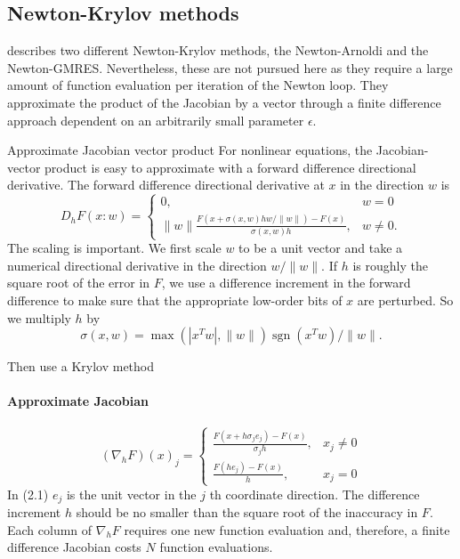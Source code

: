 
\subsection{Newton-Krylov methods}

\cite{sidi_vector_2017} describes two different Newton-Krylov methods, the Newton-Arnoldi and the Newton-GMRES.
Nevertheless, these are not pursued here as they require a large amount of function evaluation per iteration of the Newton loop. They approximate the product of the Jacobian by a vector through a finite difference approach dependent on an arbitrarily small parameter \(\epsilon\).

Approximate Jacobian vector product
For nonlinear equations, the Jacobian-vector product is easy to approximate with a forward difference directional derivative. The forward difference directional derivative at \(x\) in the direction \(w\) is
\[
D_{h} F(x: w)=\left\{\begin{array}{ll}
0, & w=0 \\
\|w\| \frac{F(x+\sigma(x, w) h w /\|w\|)-F(x)}{\sigma(x, w) h}, & w \neq 0 .
\end{array}\right.
\]
The scaling is important. We first scale \(w\) to be a unit vector and take a numerical directional derivative in the direction \(w /\|w\|\). If \(h\) is roughly the square root of the error in \(F\), we use a difference increment in the forward difference to make sure that the appropriate low-order bits of \(x\) are perturbed. So we multiply \(h\) by
\[
\sigma(x, w)=\max \left(\left|x^{T} w\right|,\|w\|\right) \operatorname{sgn}\left(x^{T} w\right) /\|w\| .
\]

Then use a Krylov method

\paragraph{Approximate Jacobian}

\[
\left(\nabla_{h} F\right)(x)_{j}=\left\{\begin{array}{ll}
\frac{F\left(x+h \sigma_{j} e_{j}\right)-F(x)}{\sigma_{j} h}, & x_{j} \neq 0 \\
\frac{F\left(h e_{j}\right)-F(x)}{h}, & x_{j}=0
\end{array}\right.
\]
In (2.1) \(e_{j}\) is the unit vector in the \(j\) th coordinate direction. The difference increment \(h\) should be no smaller than the square root of the inaccuracy in \(F\). Each column of \(\nabla_{h} F\) requires one new function evaluation and, therefore, a finite difference Jacobian costs \(N\) function evaluations.

